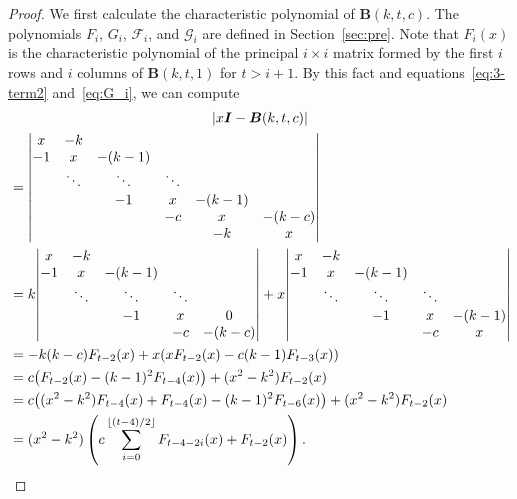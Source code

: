 \begin{proof}
We first calculate 
the characteristic polynomial of $\boldsymbol{B}(k,t,c)$. 
The polynomials $F_i$, $G_i$, $\mathscr{F}_i$, and $\mathscr{G}_i$ are defined in Section~\ref{sec:pre}. 
Note that $F_i(x)$ is the characteristic polynomial of the principal $i \times i$ matrix formed by the first 
$i$ rows and $i$ columns of $\boldsymbol{B}(k,t,1)$ for $t>i+1$. 
By this fact and equations~\eqref{eq:3-term2} and~\eqref{eq:G_i}, we can compute 
\begin{multline*}
|x \boldsymbol{I}-\boldsymbol{B}(k,t,c)|\\
\begin{aligned}
&={%
\begin{vmatrix}
x & -k & & & & \\
-1 & x & -(k-1) & & & \\
 & \ddots & \ddots & \ddots & & \\
 & &-1 & x & -(k-1)& \\
 & & & -c & x & -(k-c) \\
 & & & & -k & x 
\end{vmatrix}}\\
&=k {%
\begin{vmatrix}
x & -k & & & \\
-1 & x & -(k-1) & & \\
 & \ddots & \ddots & \ddots & \\
 & &-1 & x & 0 \\
 & & & -c & -(k-c) \\ 
\end{vmatrix}}+x{%
\begin{vmatrix}
x & -k & & & \\
-1 & x & -(k-1) & & \\
 & \ddots & \ddots & \ddots & \\
 & &-1 & x & -(k-1) \\
 & & & -c & x 
\end{vmatrix}}\\
&=-k(k-c)F_{t-2}(x)+x(x F_{t-2}(x)-c(k-1)F_{t-3}(x))\\
&= c\big(F_{t-2}(x)-(k-1)^2 F_{t-4}(x)\big)+(x^2-k^2)F_{t-2}(x)\\
&= c\big((x^2-k^2)F_{t-4}(x)+F_{t-4}(x)-(k-1)^2 F_{t-6}(x)\big)+(x^2-k^2)F_{t-2}(x)\\
&= (x^2-k^2)\left(c\sum_{i=0}^{ \lfloor (t-4)/2 \rfloor}F_{t-4-2i}(x)+F_{t-2}(x)\right).

\end{aligned}
\end{multline*}
\end{proof}
